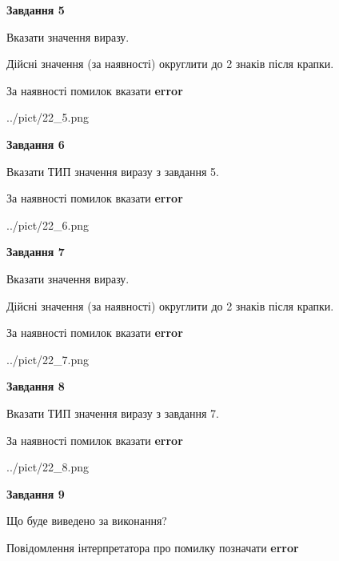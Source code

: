 \documentclass[11pt, ukrainian]{article}
\begin{document}
{\begin {large}
{\begin {center}\textbf{Завдання 5}\end {center}}\par
Вказати значення виразу. \par
Дійсні значення (за наявності) округлити до 2 знаків після крапки. \par
За наявності помилок вказати \textbf{error}

\begin{center}
	{../pict/22_5.png}
\end{center}
\newpage

{\begin {center}\textbf{Завдання 6}\end {center}}\par
Вказати ТИП значення виразу з завдання 5. \par
За наявності помилок вказати \textbf{error}

\begin{center}
	{../pict/22_6.png}
\end{center}
\newpage

{\begin {center}\textbf{Завдання 7}\end {center}}\par
Вказати значення виразу. \par
Дійсні значення (за наявності) округлити до 2 знаків після крапки. \par
За наявності помилок вказати \textbf{error}

\begin{center}
	{../pict/22_7.png}
\end{center}
\newpage

{\begin {center}\textbf{Завдання 8}\end {center}}\par
Вказати ТИП значення виразу з завдання 7. \par
За наявності помилок вказати \textbf{error}

\begin{center}
	{../pict/22_8.png}
\end{center}
\newpage

{\begin {center}\textbf{Завдання 9}\end {center}}\par
Що буде виведено за виконання? \par
Повідомлення інтерпретатора про помилку позначати \textbf{error}


\end{large}}
\end{document}
